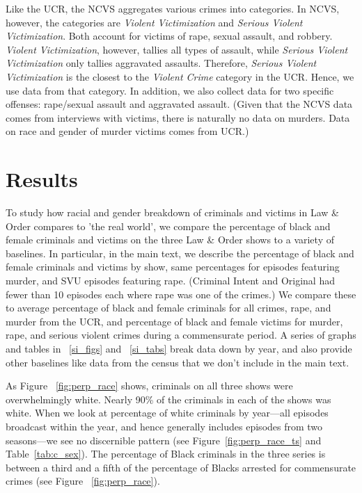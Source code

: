 \documentclass[12pt, letterpaper]{article}
\begin{document}
Like the UCR, the NCVS aggregates various crimes into categories. In NCVS, however, the categories are \textit{Violent Victimization} and \textit{Serious Violent Victimization}. Both account for victims of rape, sexual assault, and robbery. \textit{Violent Victimization}, however, tallies all types of assault, while \textit{Serious Violent Victimization} only tallies aggravated assaults. Therefore, \textit{Serious Violent Victimization} is the closest to the \textit{Violent Crime} category in the UCR. Hence, we use data from that category. In addition, we also collect data for two specific offenses: rape/sexual assault and aggravated assault. (Given that the NCVS data comes from interviews with victims, there is naturally no data on murders. Data on race and gender of murder victims comes from UCR.)

\section*{Results}
To study how racial and gender breakdown of criminals and victims in Law \& Order compares to 'the real world', we compare the percentage of black and female criminals and victims on the three Law \& Order shows to a variety of baselines. In particular, in the main text, we describe the percentage of black and female criminals and victims by show, same percentages for episodes featuring murder, and SVU episodes featuring rape. (Criminal Intent and Original had fewer than 10 episodes each where rape was one of the crimes.) We compare these to average percentage of black and female criminals for all crimes, rape, and murder from the UCR, and percentage of black and female victims for murder, rape, and serious violent crimes during a commensurate period. A series of graphs and tables in ~\ref{si_figs} and ~\ref{si_tabs} break data down by year, and also provide other baselines like data from the census that we don't include in the main text.

As Figure ~\ref{fig:perp_race} shows, criminals on all three shows were overwhelmingly white. Nearly 90\% of the criminals in each of the shows was white. When we look at percentage of white criminals by year---all episodes broadcast within the year, and hence generally includes episodes from two seasons---we see no discernible pattern (see Figure~\ref{fig:perp_race_ts} and Table~\ref{tab:c_sex}). The percentage of Black criminals in the three series is between a third and a fifth of the percentage of Blacks arrested for commensurate crimes (see Figure ~\ref{fig:perp_race}). 
\end{document}
